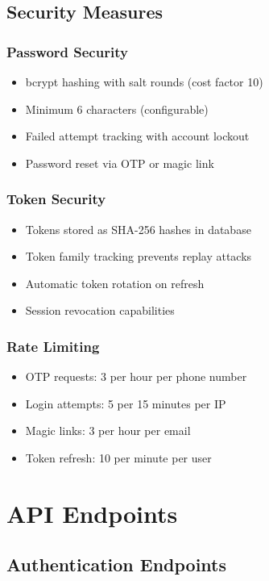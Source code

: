 \documentclass[12pt,a4paper]{article}
\begin{document}
\subsection{Security Measures}

\subsubsection{Password Security}
\begin{itemize}
    \item bcrypt hashing with salt rounds (cost factor 10)
    \item Minimum 6 characters (configurable)
    \item Failed attempt tracking with account lockout
    \item Password reset via OTP or magic link
\end{itemize}

\subsubsection{Token Security}
\begin{itemize}
    \item Tokens stored as SHA-256 hashes in database
    \item Token family tracking prevents replay attacks
    \item Automatic token rotation on refresh
    \item Session revocation capabilities
\end{itemize}

\subsubsection{Rate Limiting}
\begin{itemize}
    \item OTP requests: 3 per hour per phone number
    \item Login attempts: 5 per 15 minutes per IP
    \item Magic links: 3 per hour per email
    \item Token refresh: 10 per minute per user
\end{itemize}

\section{API Endpoints}

\subsection{Authentication Endpoints}
\end{document}

